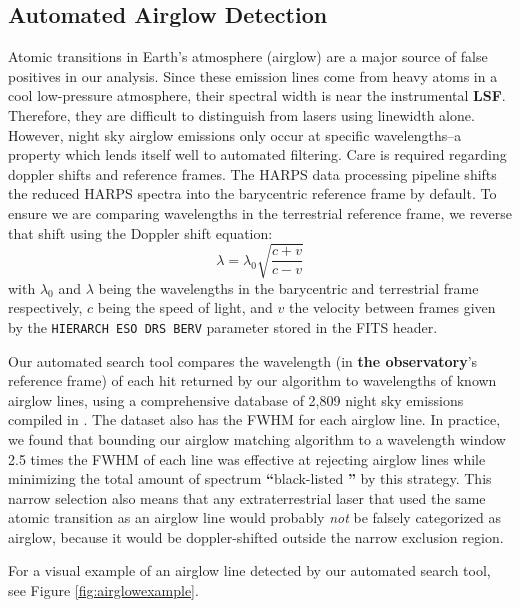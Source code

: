 \documentclass[linenumbers]{aastex701}
\providecommand{\DIFadd}[1]{{\bf #1}} %
\providecommand{\DIFaddbegin}{} %
\providecommand{\DIFaddend}{} %
\begin{document}
\subsection{Automated Airglow Detection}
\label{s:Airglow}
Atomic transitions in Earth's atmosphere (airglow) are a major source of false positives in our analysis.  Since these emission lines come from heavy atoms in a cool low-pressure atmosphere, their spectral width is near the instrumental  \DIFaddbegin \DIFadd{LSF}\DIFaddend . Therefore, they are difficult to distinguish from lasers using linewidth alone. However, night sky airglow emissions only occur at specific wavelengths--a property which lends itself well to automated filtering.  Care is required regarding doppler shifts and reference frames. The HARPS data processing pipeline shifts the reduced HARPS spectra into the barycentric reference frame by default.  To ensure we are comparing wavelengths in the terrestrial reference frame, we reverse that shift using the Doppler shift equation:
\begin{equation}
    \lambda = \lambda_0 \sqrt{\frac{c + v}{c - v}}
    \label{eq:doppler}
\end{equation}
with $\lambda_0$ and $\lambda$ being the wavelengths in the barycentric and terrestrial frame respectively, $c$ being the speed of light, and $v$ the velocity between frames given by the \texttt{HIERARCH ESO DRS BERV} parameter stored in the FITS header.  

Our automated search tool compares the wavelength (in  \DIFaddbegin \DIFadd{the observatory}\DIFaddend 's reference frame) of each hit returned by our algorithm to wavelengths of known airglow lines, using a comprehensive database of 2,809 night sky emissions compiled in \cite{faint_airglow_database}. The dataset also has the FWHM for each airglow line. In practice, we found that bounding our airglow matching algorithm to a wavelength window 2.5 times the FWHM of each line was effective at rejecting airglow lines while minimizing the total amount of spectrum  \DIFaddbegin \DIFadd{“}\DIFaddend black-listed \DIFaddbegin \DIFadd{” }\DIFaddend by this strategy.  This narrow selection also means that any extraterrestrial laser that used the same atomic transition as an airglow line would probably \emph{not} be falsely categorized as airglow, because it would be doppler-shifted outside the narrow exclusion region. 

For a visual example of an airglow line detected by our automated search tool, see Figure \ref{fig:airglowexample}.
\end{document}

